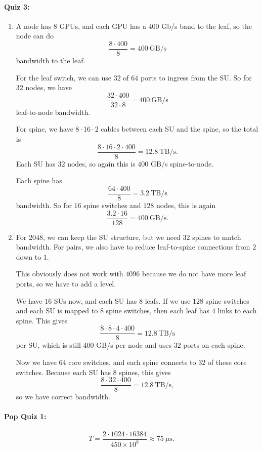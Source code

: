 \documentclass[11pt]{article}
\newcommand{\us}{\mu\mathrm{s}}
\newcommand{\quizbreak}{\Needspace{6\baselineskip}}
\begin{document}
\paragraph{Quiz 3:}
\begin{enumerate}
  \item A node has $8$ GPUs, and each GPU has a $400$ Gb/s band to the leaf, so the node can do
  \[
    \frac{8\cdot 400}{8}=400\ \mathrm{GB/s}
  \]
  bandwidth to the leaf.

  For the leaf switch, we can use $32$ of $64$ ports to ingress from the SU. So for $32$ nodes, we have
  \[
    \frac{32\cdot 400}{32\cdot 8}=400\ \mathrm{GB/s}
  \]
  leaf-to-node bandwidth.

  For spine, we have $8\cdot 16\cdot 2$ cables between each SU and the spine, so the total is
  \[
    \frac{8\cdot 16\cdot 2\cdot 400}{8}
    =
    12.8\ \mathrm{TB/s}.
  \]
  Each SU has $32$ nodes, so again this is $400$ GB/s spine-to-node.

  Each spine has
  \[
    \frac{64\cdot 400}{8}
    =
    3.2\ \mathrm{TB/s}
  \]
  bandwidth. So for $16$ spine switches and $128$ nodes, this is again
  \[
    \frac{3.2\cdot 16}{128}
    =
    400\ \mathrm{GB/s}.
  \]

  \item For $2048$, we can keep the SU structure, but we need $32$ spines to match bandwidth. For pairs, we also have to reduce leaf-to-spine connections from $2$ down to $1$.

  This obviously does not work with $4096$ because we do not have more leaf ports, so we have to add a level.

  We have $16$ SUs now, and each SU has $8$ leafs. If we use $128$ spine switches and each SU is mapped to $8$ spine switches, then each leaf has $4$ links to each spine. This gives
  \[
    \frac{8\cdot 8\cdot 4\cdot 400}{8}
    =
    12.8\ \mathrm{TB/s}
  \]
  per SU, which is still $400$ GB/s per node and uses $32$ ports on each spine.

  Now we have $64$ core switches, and each spine connects to $32$ of these core switches. Because each SU has $8$ spines, this gives
  \[
    \frac{8\cdot 32\cdot 400}{8}
    =
    12.8\ \mathrm{TB/s},
  \]
  so we have correct bandwidth.
\end{enumerate}

\quizbreak
\paragraph{Pop Quiz 1:}
\[
  T=\frac{2\cdot 1024\cdot 16384}{450\times 10^9}
  \approx 75\ \us.
\]
\end{document}
